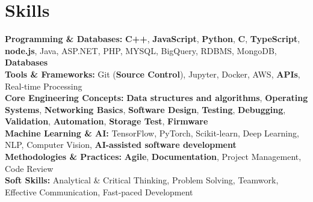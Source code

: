 \documentclass[a4paper,10pt]{article}
\begin{document}
\section*{Skills}
\textbf{Programming \& Databases: } \textbf{C++}, \textbf{JavaScript}, \textbf{Python}, \textbf{C}, \textbf{TypeScript}, \textbf{node.js}, Java, ASP.NET, PHP, MYSQL, BigQuery, RDBMS, MongoDB, \textbf{Databases} \\
\textbf{Tools \& Frameworks: } Git (\textbf{Source Control}), Jupyter, Docker, AWS, \textbf{APIs}, Real-time Processing \\
\textbf{Core Engineering Concepts: } \textbf{Data structures and algorithms}, \textbf{Operating Systems}, \textbf{Networking Basics}, \textbf{Software Design}, \textbf{Testing}, \textbf{Debugging}, \textbf{Validation}, \textbf{Automation}, \textbf{Storage Test}, \textbf{Firmware} \\
\textbf{Machine Learning \& AI: } TensorFlow, PyTorch, Scikit-learn, Deep Learning, NLP, Computer Vision, \textbf{AI-assisted software development} \\
\textbf{Methodologies \& Practices: } \textbf{Agile}, \textbf{Documentation}, Project Management, Code Review \\
\textbf{Soft Skills: } Analytical \& Critical Thinking, Problem Solving, Teamwork, Effective Communication, Fast-paced Development \\

\vspace{-4mm}
\end{document}
